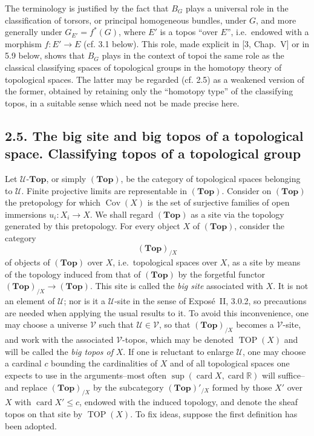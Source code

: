 \documentclass[11pt]{article}
\newcommand{\U}{\mathcal{U}}
\newcommand{\V}{\mathcal{V}}
\newcommand{\Esp}{\mathbf{Top}}
\newcommand{\TOP}{\operatorname{TOP}}
\newcommand{\Cov}{\operatorname{Cov}}
\newcommand{\ie}{i.e.}
\begin{document}
The terminology is justified by the fact that \(B_G\) plays a universal role in the classification of torsors, or principal homogeneous bundles, under \(G\), and more generally under \(G_{E'}=f^\ast(G)\), where \(E'\) is a topos ``over \(E\)'', \ie\ endowed with a morphism \(f:E'\to E\) (cf. 3.1 below). This role, made explicit in [3, Chap.~V] or in 5.9 below, shows that \(B_G\) plays in the context of topoi the same role as the classical classifying spaces of topological groups in the homotopy theory of topological spaces. The latter may be regarded (cf. 2.5) as a weakened version of the former, obtained by retaining only the ``homotopy type'' of the classifying topos, in a suitable sense which need not be made precise here.

\subsection*{2.5. The big site and big topos of a topological space. Classifying topos of a topological group}
Let \(\U\text{-}\Esp\), or simply \((\Esp)\), be the category of topological spaces belonging to \(\U\). Finite projective limits are representable in \((\Esp)\). Consider on \((\Esp)\) the pretopology for which \(\Cov(X)\) is the set of surjective families of open immersions \(u_i:X_i\to X\). We shall regard \((\Esp)\) as a site via the topology generated by this pretopology. For every object \(X\) of \((\Esp)\), consider the category
\[
(\Esp)_{/X}
\]
of objects of \((\Esp)\) over \(X\), \ie\ topological spaces over \(X\), as a site by means of the topology induced from that of \((\Esp)\) by the forgetful functor \((\Esp)_{/X}\to(\Esp)\). This site is called the \emph{big site} associated with \(X\). It is not an element of \(\U\); nor is it a \(\U\)-site in the sense of Expos\'e~II, 3.0.2, so precautions are needed when applying the usual results to it. To avoid this inconvenience, one may choose a universe \(\V\) such that \(\U\in\V\), so that \((\Esp)_{/X}\) becomes a \(\V\)-site, and work with the associated \(\V\)-topos, which may be denoted \(\TOP(X)\) and will be called the \emph{big topos of} \(X\). If one is reluctant to enlarge \(\U\), one may choose a cardinal \(c\) bounding the cardinalities of \(X\) and of all topological spaces one expects to use in the arguments--most often \(\sup(\operatorname{card}X,\operatorname{card}\mathbb R)\) will suffice--and replace \((\Esp)_{/X}\) by the subcategory \((\Esp)'_{/X}\) formed by those \(X'\) over \(X\) with \(\operatorname{card}X'\le c\), endowed with the induced topology, and denote the sheaf topos on that site by \(\TOP(X)\). To fix ideas, suppose the first definition has been adopted.
\end{document}
